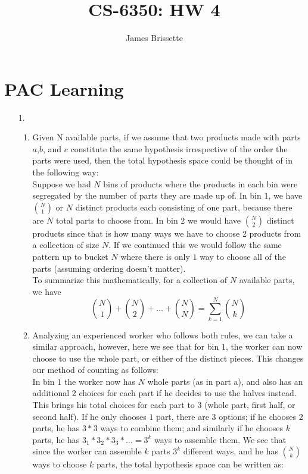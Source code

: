 \documentclass[11pt,a4paper]{article}
\author{James Brissette}
\title{CS-6350: HW 4}
\begin{document}
	\maketitle
	
	\section{PAC Learning}
		\begin{itemize}
			\item [1.]
				\begin{enumerate} [label={\alph*)}]
					\item  Given N available parts, if we assume that two products made with parts $a$,$b$, and $c$ constitute the same hypothesis irrespective of the order the parts were used, then the total hypothesis space could be thought of in the following way:\\ 
					
					Suppose we had $N$ bins of products where the products in each bin were segregated by the number of parts they are made up of. In bin $1$, we have ${N \choose 1}$ or $N$ distinct products each consisting of one part, because there are $N$ total parts to choose from. In bin $2$ we would have ${N \choose 2}$ distinct products since that is how many ways we have to choose 2 products from a collection of size $N$. If we continued this we would follow the same pattern up to bucket $N$ where there is only $1$ way to choose all of the parts (assuming ordering doesn't matter).\\
					
					To summarize this mathematically, for a collection of $N$ available parts, we have 
					$${N \choose 1} + {N \choose 2} + \dots + {N \choose N} = \displaystyle\sum_{k=1}^{N} {N \choose k}$$
					\item Analyzing an experienced worker who follows both rules, we can take a similar approach, however, here we see that for bin $1$, the worker can now choose to use the whole part, or either of the distinct pieces. This changes our method of counting as follows:\\
					In bin $1$ the worker now has $N$ whole parts (as in part a), and also has an additional $2$ choices for each part if he decides to use the halves instead. This brings his total choices for each part to $3$ (whole part, first half, or second half). If he only chooses $1$ part, there are $3$ options; if he chooses $2$ parts, he has $3*3$ ways to combine them; and similarly if he chooses $k$ parts, he has $3_1*3_2*3_3* \dots = 3^k$ ways to assemble them. We see that since the worker can assemble $k$ parts $3^k$ different ways, and he has ${N \choose k}$ ways to choose $k$ parts, the total hypothesis space can be written as:
					

\end{enumerate}
\end{itemize}
\end{document}
